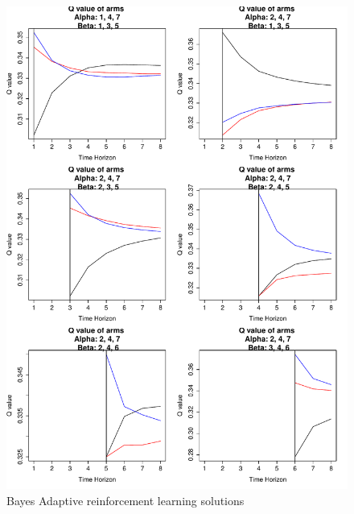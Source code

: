 \documentclass[11pt,a4,singlespacing,titlepagenumber=on]{scrreprt}
\numberwithin{equation}{chapter} %
\theoremstyle{remark}
\begin{document}
\begin{figure}[H]
    \centering
    \includegraphics[scale=0.7]{BARLillustration.pdf}
    \caption{Bayes Adaptive reinforcement learning solutions}
\end{figure}
\end{document}
